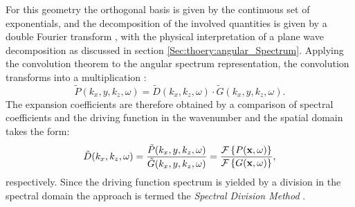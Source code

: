 For this geometry the orthogonal basis is given by the continuous set of exponentials, and the decomposition of the involved quantities is given by a double Fourier transform \cite{Ahrens2012, Arfken2005,Schultz2014:Comparing_approaches}, with the physical interpretation of a plane wave decomposition as discussed in section \ref{Sec:thoery:angular_Spectrum}.
Applying the convolution theorem to the angular spectrum representation, the convolution transforms into a multiplication \cite{Girod2001}:
\begin{equation}
\tilde{P}(k_x,y,k_z, \omega) = \tilde{D}(k_x,k_z, \omega) \cdot \tilde{G}(k_x,y,k_z, \omega).
\end{equation}
%
The expansion coefficients are therefore obtained by a comparison of spectral coefficients and the driving function in the wavenumber and the spatial domain takes the form:
\begin{equation}
\tilde{D}(k_x,k_z,\omega) = \frac{\tilde{P}(k_x,y,k_z, \omega)}{ \tilde{G}(k_x,y,k_z, \omega)} = 
\frac{\mathcal{F}\left\{ P(\mathbf{x},\omega) \right\} }
{  \mathcal{F}\left\{ G(\mathbf{x},\omega) \right\} },
\label{Eq:Theory:Dkxkz}
\end{equation}
respectively.
Since the driving function spectrum is yielded by a division in the spectral domain the approach is termed the \emph{Spectral Division Method} \cite{Ahrens2010a, Ahrens2012:Ambisonics_for_planar_linear, Ahrens2011:icassp, Ahrens2010:Ambisonics_w_planar_linear}.

